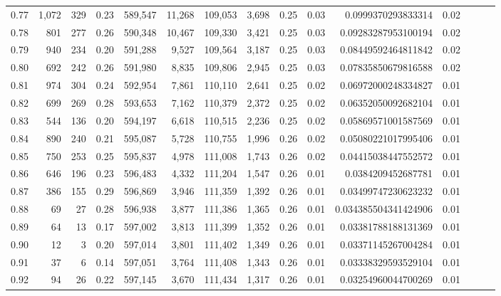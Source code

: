 \begin{tabular}{rrrrrrrrrrrrrrr}
0.77 &   1,072 &    329 &  0.23 &  589,547 &   11,268 &  109,053 &    3,698 &  0.25 &  0.03 &    0.0999370293833314 &      0.02 \\
0.78 &     801 &    277 &  0.26 &  590,348 &   10,467 &  109,330 &    3,421 &  0.25 &  0.03 &   0.09283287953100194 &      0.02 \\
0.79 &     940 &    234 &  0.20 &  591,288 &    9,527 &  109,564 &    3,187 &  0.25 &  0.03 &   0.08449592464811842 &      0.02 \\
0.80 &     692 &    242 &  0.26 &  591,980 &    8,835 &  109,806 &    2,945 &  0.25 &  0.03 &   0.07835850679816588 &      0.02 \\
0.81 &     974 &    304 &  0.24 &  592,954 &    7,861 &  110,110 &    2,641 &  0.25 &  0.02 &   0.06972000248334827 &      0.01 \\
0.82 &     699 &    269 &  0.28 &  593,653 &    7,162 &  110,379 &    2,372 &  0.25 &  0.02 &   0.06352050092682104 &      0.01 \\
0.83 &     544 &    136 &  0.20 &  594,197 &    6,618 &  110,515 &    2,236 &  0.25 &  0.02 &   0.05869571001587569 &      0.01 \\
0.84 &     890 &    240 &  0.21 &  595,087 &    5,728 &  110,755 &    1,996 &  0.26 &  0.02 &   0.05080221017995406 &      0.01 \\
0.85 &     750 &    253 &  0.25 &  595,837 &    4,978 &  111,008 &    1,743 &  0.26 &  0.02 &   0.04415038447552572 &      0.01 \\
0.86 &     646 &    196 &  0.23 &  596,483 &    4,332 &  111,204 &    1,547 &  0.26 &  0.01 &    0.0384209452687781 &      0.01 \\
0.87 &     386 &    155 &  0.29 &  596,869 &    3,946 &  111,359 &    1,392 &  0.26 &  0.01 &   0.03499747230623232 &      0.01 \\
0.88 &      69 &     27 &  0.28 &  596,938 &    3,877 &  111,386 &    1,365 &  0.26 &  0.01 &  0.034385504341424906 &      0.01 \\
0.89 &      64 &     13 &  0.17 &  597,002 &    3,813 &  111,399 &    1,352 &  0.26 &  0.01 &   0.03381788188131369 &      0.01 \\
0.90 &      12 &      3 &  0.20 &  597,014 &    3,801 &  111,402 &    1,349 &  0.26 &  0.01 &   0.03371145267004284 &      0.01 \\
0.91 &      37 &      6 &  0.14 &  597,051 &    3,764 &  111,408 &    1,343 &  0.26 &  0.01 &   0.03338329593529104 &      0.01 \\
0.92 &      94 &     26 &  0.22 &  597,145 &    3,670 &  111,434 &    1,317 &  0.26 &  0.01 &   0.03254960044700269 &      0.01 \\

\end{tabular}
